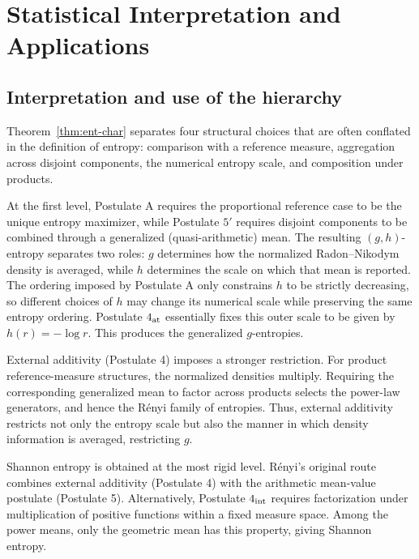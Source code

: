 \documentclass[reqno]{amsart}
\begin{document}
\vspace{0.5em}



\section{Statistical Interpretation and Applications}
\label{sec:stat-interpret}

\subsection{Interpretation and use of the hierarchy}

Theorem~\ref{thm:ent-char} separates four structural choices that are
often conflated in the definition of entropy: comparison with a reference
measure, aggregation across disjoint components, the numerical entropy
scale, and composition under products.

At the first level, Postulate A requires the proportional reference case
to be the unique entropy maximizer, while Postulate $5'$ requires
disjoint components to be combined through a generalized (quasi-arithmetic) mean. The
resulting $(g,h)$-entropy separates two roles: $g$ determines how the
normalized Radon--Nikodym density is averaged, while $h$ determines the
scale on which that mean is reported. The ordering imposed by Postulate A only constrains $h$ to be strictly decreasing, so different choices of $h$ may change its numerical scale while preserving the same entropy ordering.
Postulate $4_{\rm at}$ essentially fixes this outer scale to be given by
$h(r)=-\log r$.
This produces the generalized $g$-entropies.

External additivity (Postulate 4) imposes a stronger restriction. For product reference-measure structures, the normalized densities multiply. Requiring the corresponding generalized mean to factor across products selects the power-law generators, and hence the R\'enyi family of entropies. Thus, external additivity restricts not only the entropy scale but also the manner in which density information is averaged, restricting $g$.

Shannon entropy is obtained at the most rigid level. R\'enyi's original route combines external additivity (Postulate 4) with the arithmetic mean-value
postulate (Postulate 5). Alternatively, Postulate $4_{\rm int}$ requires factorization under multiplication of positive functions within a fixed measure space. Among the power means, only the geometric mean has this property, giving 
Shannon entropy.
\end{document}
